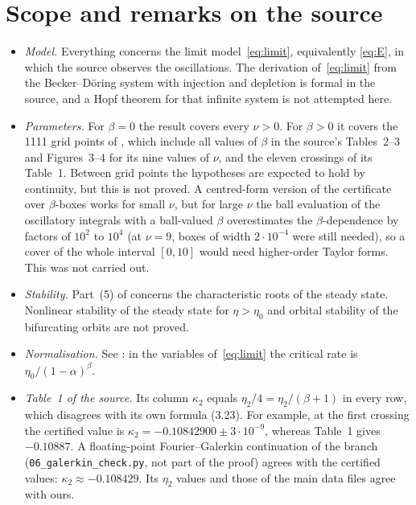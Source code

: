 \documentclass[11pt,a4paper]{report}
\begin{document}
\section{Scope and remarks on the source}\label{sec:scope}
\begin{itemize}
\item \emph{Model.} Everything concerns the limit model~\eqref{eq:limit}, equivalently \eqref{eq:E}, in which the source observes the oscillations. The derivation of~\eqref{eq:limit} from the Becker--Döring system with injection and depletion is formal in the source, and a Hopf theorem for that infinite system is not attempted here.
\item \emph{Parameters.} For $\beta=0$ the result covers every $\nu>0$. For $\beta>0$ it covers the 1111 grid points of , which include all values of $\beta$ in the source's Tables~2--3 and Figures~3--4 for its nine values of $\nu$, and the eleven crossings of its Table~1. Between grid points the hypotheses are expected to hold by continuity, but this is not proved. A centred-form version of the certificate over $\beta$-boxes works for small $\nu$, but for large $\nu$ the ball evaluation of the oscillatory integrals with a ball-valued $\beta$ overestimates the $\beta$-dependence by factors of $10^2$ to $10^4$ (at $\nu=9$, boxes of width $2\cdot10^{-4}$ were still needed), so a cover of the whole interval $[0,10]$ would need higher-order Taylor forms. This was not carried out.
\item \emph{Stability.} Part~(5) of  concerns the characteristic roots of the steady state. Nonlinear stability of the steady state for $\eta>\eta_0$ and orbital stability of the bifurcating orbits are not proved.
\item \emph{Normalisation.} See : in the variables of~\eqref{eq:limit} the critical rate is $\eta_0/(1-\alpha)^\beta$.
\item \emph{Table~1 of the source.} Its column $\kappa_2$ equals $\eta_2/4=\eta_2/(\beta+1)$ in every row, which disagrees with its own formula (3.23). For example, at the first crossing the certified value is $\kappa_2=-0.10842900\pm3\cdot10^{-9}$, whereas Table~1 gives $-0.10887$. A floating-point Fourier--Galerkin continuation of the branch (\texttt{06\_galerkin\_check.py}, not part of the proof) agrees with the certified values: $\kappa_2\approx-0.108429$. Its $\eta_2$ values and those of the main data files agree with ours.
\end{itemize}
\end{document}
